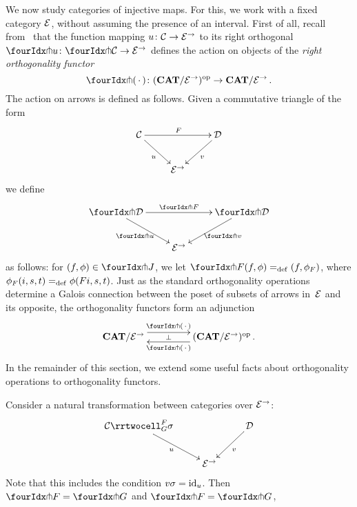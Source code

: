 \documentclass[reqno,10pt,a4paper,oneside]{amsart}
\begin{document}
We now study categories of injective maps. For this, we work with a fixed category $\mathcal{E}$, without assuming the presence of an interval. First of all, recall from~\cite{garner:small-object-argument} that the function mapping $u \colon \mathcal{C} \to \mathcal{E}^\to$ to its right orthogonal $\liftr{u} \co \liftr{\cal{C}} \to \cal{E}^\to$ defines the action on objects of the \emph{right orthogonality functor}
\[
\liftr{\brarghole} \co  (\CAT/\catE^{\to})^{\op} \to \CAT/\catE^{\to} \, .
\]
The action  on arrows is defined as follows. Given a commutative triangle of the form
\[
\xymatrix{
\cal{C} \ar[dr]_u \ar[rr]^F & & \cal{D} \ar[dl]^{v} \\
 & \catE^\to }
 \]
we define 
\[
\xymatrix{
\liftr{\cal{D}} \ar[dr]_{\liftr{u}} \ar[rr]^{\liftr{F}} & & \liftr{\cal{D}} \ar[dl]^{\liftr{v}} \\
 & \catE^\to }
\]
as follows: for $(f, \phi) \in \liftr{J}$, we let $\liftr{F}(f,\phi) \defeq (f, \phi_F)$, where $\phi_F(i, s, t) =_{\operatorname{def}} \phi(Fi, s, t)$. 
Just as the standard orthogonality operations determine a Galois connection between the poset of subsets of arrows in~$\mathcal{E}$ and its opposite, the orthogonality functors form an adjunction 
\begin{equation}
\label{garner-adjunction}
\begin{gathered}
\xymatrix@C+2em{
  \CAT/\catE^{\to}
  \ar@<5pt>[r]^-{\liftl{\brarghole}}
  \ar@{}[r]|-{\bot}
&
  (\CAT/\catE^{\to})^{\op} \, .
  \ar@<5pt>[l]^-{\liftr{\brarghole}}
}
\end{gathered}
\end{equation}
In the remainder of this section, we extend some useful facts about orthogonality operations to orthogonality functors.






\begin{proposition}
Consider a natural transformation between categories over $\mathcal{E}^{\to}$:
\[
\xymatrix{
  \cal{C}
  \rrtwocell_G^F{\sigma}
 \ar[dr]_{u}
&&
  \cal{D}
  \ar[dl]^{v}
\\&
  \catE^{\to}
}
\]
Note that this includes the condition $v \sigma = \operatorname{id}_u$.
Then $\liftr{F} = \liftr{G}$ and $\liftl{F} = \liftl{G}$, 
\end{proposition}
\end{document}

